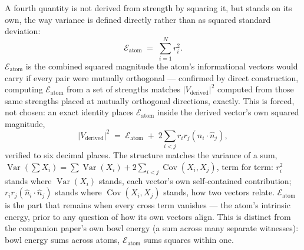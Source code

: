 \documentclass[12pt, a4paper]{article}
\begin{document}
A fourth quantity is not derived from strength by squaring it, but
stands on its own, the way variance is defined directly rather than
as squared standard deviation:
\begin{equation}
    \mathcal{E}_{\text{atom}} \;=\; \sum_{i=1}^N r_i^2.
    \label{eq:information_energy}
\end{equation}
$\mathcal{E}_{\text{atom}}$ is the combined squared magnitude the
atom's informational vectors would carry if every pair were mutually
orthogonal --- confirmed by direct construction, computing
$\mathcal{E}_{\text{atom}}$ from a set of strengths matches $\lvert
V_{\text{derived}}\rvert^2$ computed from those same strengths placed
at mutually orthogonal directions, exactly. This is forced, not
chosen: an exact identity places $\mathcal{E}_{\text{atom}}$ inside
the derived vector's own squared magnitude,
\[
\lvert V_{\text{derived}}\rvert^2 \;=\; \mathcal{E}_{\text{atom}}
\;+\; 2\sum_{i<j} r_ir_j(\hat n_i\cdot\hat n_j),
\]
verified to six decimal places. The structure matches the variance
of a sum, $\operatorname{Var}(\sum X_i) = \sum\operatorname{Var}(X_i)
+ 2\sum_{i<j}\operatorname{Cov}(X_i,X_j)$, term for term: $r_i^2$
stands where $\operatorname{Var}(X_i)$ stands, each vector's own
self-contained contribution; $r_ir_j(\hat n_i\cdot\hat n_j)$ stands
where $\operatorname{Cov}(X_i,X_j)$ stands, how two vectors relate.
$\mathcal{E}_{\text{atom}}$ is the part that remains when every cross
term vanishes --- the atom's intrinsic energy, prior to any question
of how its own vectors align. This is distinct from the companion
paper's own bowl energy (a sum across many separate witnesses):
bowl energy sums across atoms, $\mathcal{E}_{\text{atom}}$ sums
squares within one.
\end{document}
